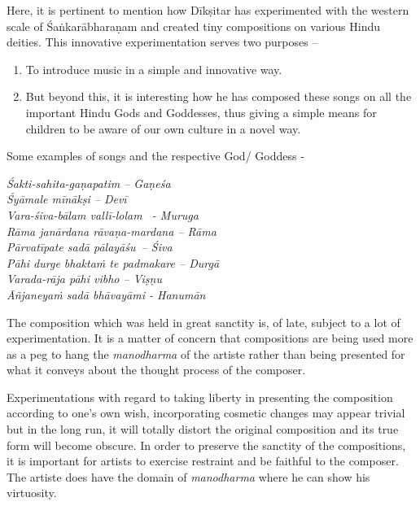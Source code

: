 Here, it is pertinent to mention how Dīkṣitar has experimented with the western scale of Śaṅkarābharaṇam and created tiny compositions on various Hindu deities. This innovative experimentation serves two purposes –

\vspace{-.3cm}

\begin{enumerate}
\itemsep=0pt
\item To introduce music in a simple and innovative way.

 \item But beyond this, it is interesting how he has composed these songs on all the important Hindu Gods and Goddesses, thus giving a simple means for children to be aware of our own culture in a novel way.

\end{enumerate}

\vspace{-.3cm}

Some examples of songs and the respective God/ Goddess -

\begin{myquote}
\textit{Śakti-sahita-gaṇapatim – Gaṇeśa} \\\textit{Śyāmale mīnākṣi – Devī}\\\textit{Vara-śiva-bālam vallī-lolam  - Muruga}\\\textit{Rāma janārdana rāvaṇa-mardana – Rāma} \\\textit{Pārvatīpate sadā pālayāśu – Śiva}\\\textit{Pāhi durge bhaktaṁ te padmakare – Durgā} \\\textit{Varada-rāja pāhi vibho – Viṣṇu}\\\textit{Āñjaneyaṁ sadā bhāvayāmi - Hanumān}
\end{myquote}

The composition which was held in great sanctity is, of late, subject to a lot of experimentation. It is a matter of concern that compositions are being used more as a peg to hang the \textit{manodharma} of the artiste rather than being presented for what it conveys about the thought process of the composer.

Experimentations with regard to taking liberty in presenting the composition according to one’s own wish, incorporating cosmetic changes may appear trivial but in the long run, it will totally distort the original composition and its true form will become obscure. In order to preserve the sanctity of the compositions, it is important for artists to exercise restraint and be faithful to the composer. The artiste does have the domain of \textit{manodharma} where he can show his virtuosity.

